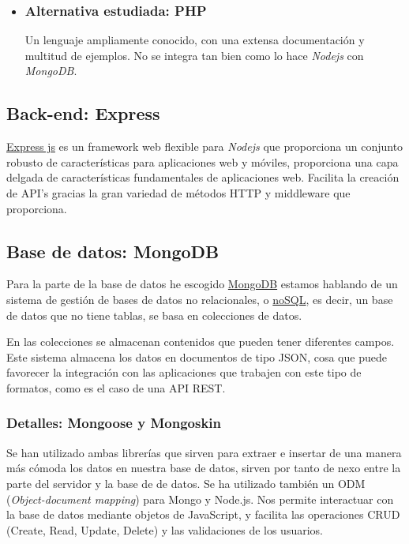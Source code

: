 
\begin{itemize}
	\item \subsubsection{Alternativa estudiada: PHP}\label{php}
	Un lenguaje ampliamente conocido, con una extensa documentación y multitud de ejemplos. No se integra tan bien como lo hace \emph{Nodejs} con \emph{MongoDB}. 
\end{itemize}


\subsection{Back-end: Express }\label{tecnologias_expressjs}
\href{http://expressjs.com/}{Express js} es un framework web flexible para \emph{Nodejs} que proporciona un conjunto robusto de características para aplicaciones web y móviles, proporciona una capa delgada de características fundamentales de aplicaciones web. Facilita la creación de API’s gracias la gran variedad de métodos HTTP y middleware que proporciona.



\subsection{Base de datos: MongoDB}\label{tecnologias_mongodb}
Para la parte de la base de datos he escogido \href{https://www.mongodb.com/}{MongoDB} estamos hablando de un sistema de gestión de bases de datos no relacionales, o \href{https://es.wikipedia.org/wiki/NoSQL}{noSQL}, es decir, un base de datos que no tiene tablas, se basa en colecciones de datos.

En las colecciones se almacenan contenidos que pueden tener diferentes campos. Este sistema almacena los datos en documentos de tipo JSON, cosa que puede favorecer la integración con las aplicaciones que trabajen con este tipo de formatos, como es el caso de una API REST. 


\subsubsection{Detalles: Mongoose y Mongoskin}\label{mongoose}
Se han utilizado ambas librerías que sirven para extraer e insertar de una manera más cómoda los datos en nuestra base de datos, sirven por tanto de nexo entre la parte del servidor y la base de de datos. Se ha utilizado también un ODM (\emph{Object-document mapping}) para Mongo y Node.js. Nos permite interactuar con la base de datos mediante objetos de JavaScript, y facilita las operaciones CRUD (Create, Read, Update, Delete) y las validaciones de los usuarios.

